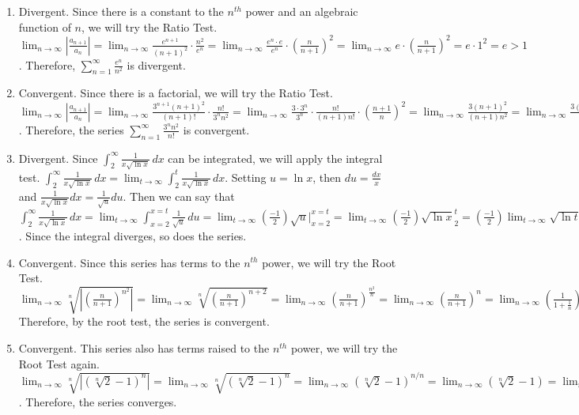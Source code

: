 \begin{Answer}[ref = test]
\begin{enumerate}
\item Divergent. Since there is a constant to the $n^{th}$ power and an algebraic 
function of $n$, we will try the Ratio Test. $\lim_{n \to \infty} \left| 
\frac{a_{n+1}}{a_n} \right| = \lim_{n \to \infty} \frac{e^{n + 1}}{(n + 1)^2} 
\cdot \frac{n^2}{e^n} = \lim_{n \to \infty} \frac{e^n \cdot e}{e^n} \cdot 
\left( \frac{n}{n + 1} \right)^2 = \lim_{n \to \infty} e \cdot \left( 
\frac{n}{n + 1} \right)^2 = e \cdot 1^2 = e >1$. Therefore, $\sum_{n=1}^\infty 
\frac{e^n}{n^2}$ is divergent. 
\item Convergent. Since there is a factorial, we will try the Ratio Test. $\lim_{n \to 
\infty} \left| \frac{a_{n+1}}{a_n} \right| = \lim_{n \to \infty} 
\frac{3^{n + 1}(n + 1)^2}{(n + 1)!} \cdot \frac{n!}{3^n n^2} = \lim_{n \to 
\infty} \frac{3 \cdot 3^n}{3^n} \cdot \frac{n!}{(n+1)n!} \cdot \left( 
\frac{n + 1}{n} \right)^2 = \lim_{n \to \infty} \frac{3(n+1)^2}{(n+1)n^2} = 
\lim_{n \to \infty} \frac{3(n+1)}{n^2} = 0 < 1$. Therefore, the series 
$\sum_{n=1}^\infty \frac{3^n n^2}{n!}$ is convergent. 
\item Divergent. Since $\int_2^\infty \frac{1}{x\sqrt{\ln{x}}}\,dx$ can be integrated, we 
will apply the integral test. $\int_2^\infty \frac{1}{x\sqrt{\ln{x}}}\,dx = 
\lim_{t \to \infty} \int_2^t \frac{1}{x\sqrt{\ln{x}}}\,dx$. Setting $u = 
\ln{x}$, then $du = \frac{dx}{x}$ and $\frac{1}{x\sqrt{\ln{x}}}dx = 
\frac{1}{\sqrt{u}}du$. Then we can say that $\int_2^\infty \frac{1}{x\sqrt{\ln{
x}}}\,dx = \lim_{t \to \infty} \int_{x=2}^{x=t} \frac{1}{\sqrt{u}}\,du = 
\lim_{t \to \infty} \left( \frac{-1}{2} \right) \sqrt{u} |_{x=2}^{x=t} = 
\lim_{t \to \infty} \left( \frac{-1}{2} \right) \sqrt{\ln{x}}_{2}^{t} = \left( 
\frac{-1}{2} \right) \lim_{t \to \infty} \sqrt{\ln{t}} - \left( \frac{-1}{2} 
\right) \sqrt{\ln{2}} = \infty$. Since the integral diverges, so does the 
series. 
\item Convergent. Since this series has terms to the $n^{th}$ power, we will 
try the Root Test. $\lim_{n \to \infty} \sqrt[n]{\left| \left( \frac{n}{n+1} 
\right)^{n^2} \right| } = \lim_{n \to \infty} \sqrt[n]{\left( \frac{n}{n+1} 
\right)^{n+2}} = \lim_{n \to \infty} \left(\frac{n}{n+1} \right)^{\frac{n^2}{
n}} = \lim_{n \to \infty} \left( \frac{n}{n+1} \right)^n = \lim_{n \to \infty} 
\left( \frac{1}{1 + \frac{1}{n}} \right)^n = \frac{1}{lim_{n \to \infty} \left(
1 + \frac{1}{n} \right)^n} = \frac{1}{e} < 1$ Therefore, by the root test, the 
series is convergent.
\item Convergent. This series also has terms raised to the $n^{th}$ power, we 
will try the Root Test again. $\lim_{n \to \infty} \sqrt[n]{\left| \left(\sqrt[
n]{2} - 1\right)^n \right| } = \lim_{n \to \infty} \sqrt[n]{\left( \sqrt[n]{2} 
- 1 \right)^n} = \lim_{n \to \infty}\left(\sqrt[n]{2} - 1 \right)^{n/n} = \lim_
{n \to \infty} \left( \sqrt[n]{2} - 1 \right) = \lim_{n \to \infty} 2^{1/n} - 
1 = 1 - 1 = 0 < 1$. Therefore, the series converges. 
\end{enumerate}
\end{Answer}




